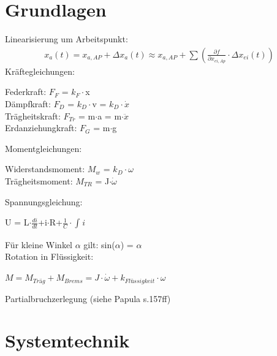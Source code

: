 \documentclass[10pt,a4paper]{article}
\begin{document}
\twocolumn
\pagestyle{fancy}
\section{Grundlagen}
    Linearisierung um Arbeitspunkt:
    \begin{align*}
        x_{a}(t)=x_{a,AP}+\Delta x_{a}(t) \approx x_{a,AP}+\sum\left(\frac{\partial f}
        {\partial x_{ei,Ap}} \cdot \Delta x_{ei}(t)\right)
    \end{align*}
    Kräftegleichungen:
    \begin{mdframed}[style=exercise]
        Federkraft: $F_F$ = $k_F \cdot$x\\
        Dämpfkraft: $F_D$ = $k_D \cdot$v = $k_D \cdot \dot{x}$\\
        Trägheitskraft: $F_{Tr}$ = m$\cdot$a = m$\cdot \ddot{x}$\\
        Erdanziehungkraft: $F_G$ = m$\cdot$g
    \end{mdframed}
    Momentgleichungen:
    \begin{mdframed}[style=exercise]
        Widerstandsmoment: $M_w$ = $k_D \cdot \omega$\\
        Trägheitsmoment: $M_{TR}$ = J$\cdot \dot{\omega}$
    \end{mdframed}
    Spannungsgleichung:
    \begin{mdframed}[style=exercise]
        U = L$\cdot \frac{di}{dt}$+i$\cdot$R+$\frac{1}{C} \cdot \int_{} i$
    \end{mdframed}
    Für kleine Winkel $\alpha$ gilt: sin($\alpha$) = $\alpha$\\
    Rotation in Flüssigkeit:
        \begin{center}
            $M=M_{Träg}+M_{Brems}=J \cdot \dot{\omega} +k_{Flüssigkeit} \cdot \omega$
        \end{center}
    Partialbruchzerlegung (siehe Papula s.157ff)












\section{Systemtechnik}
\end{document}

